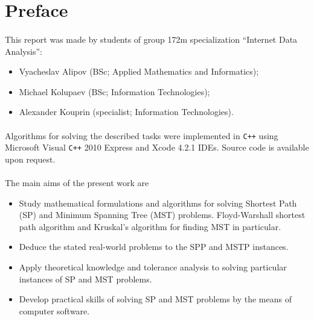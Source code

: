 \section{Preface}

\paragraph{}
	This report was made by students of group 172m specialization ``Internet Data Analysis'':

\begin{itemize}
	\item Vyacheslav Alipov (BSc; Applied Mathematics and Informatics);
	\item Michael Kolupaev (BSc; Information Technologies);
	\item Alexander Kouprin (specialist; Information Technologies).
\end{itemize}

\paragraph{}
	Algorithms for solving the described tasks were implemented in \verb!C++! using Microsoft Visual \verb!C++! 2010 Express and Xcode 4.2.1 IDEs. Source code is available upon request.

\paragraph{}
	The main aims of the present work are 
\begin{itemize}
	\item Study mathematical formulations and algorithms for solving Shortest Path (SP) and Minimum Spanning Tree (MST) problems. Floyd-Warshall shortest path algorithm and Kruskal's algorithm for finding MST in particular.
	\item Deduce the stated real-world problems to the SPP and MSTP instances.
	\item Apply theoretical knowledge and tolerance analysis to solving particular instances of SP and MST problems.
	\item Develop practical skills of solving SP and MST problems by the means of computer software.
\end{itemize}
